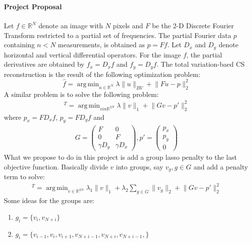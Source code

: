 \documentclass[12pt, leqno]{article}
\providecommand{\norm}[1]{\lVert#1\rVert} %
\DeclareMathOperator*{\argmin}{arg\,min}
\begin{document}
\pagestyle{fancy}

\begin{center}
{\large {\bf Project Proposal}} \\
\end{center}

\paragraph{} Let $f \in \mathbb{R}^N$ denote an image with $N$ pixels and $F$ be the 2-D Discrete Fourier Transform restricted to a partial set of frequencies. The partial Fourier data $p$ containing $n<N$ measurements, is obtained as $p = Ff$. Let $D_x$ and $D_y$ denote horizontal and vertical differential operators.  For the image $f$, the partial derivatives are obtained by $f_x =  D_x f$ and $f_y = D_y f$. The total variation-baed CS reconstruction is the result of the following optimization problem:
$$
\hat{f} = \argmin_{u \in \mathbb{R}^N} \lambda \norm{u}_{BV} + \norm{Fu-p}_2^2
$$
A similar problem is to solve the following problem:
\begin{align*}
[\hat{f}_x,\hat{f}_y]^T = \argmin_{v in \mathbb{R}^{2N}} \lambda \norm{v}_1 + \norm{Gv - p'}_2^2
\end{align*}
where $p_x = FD_xf$, $p_y = FD_yf$ and 
\begin{align*}
G = \begin{pmatrix} F & 0 \\
0& F\\
\gamma D_y & \gamma D_x
\end{pmatrix}, 
p' = \begin{pmatrix} p_x \\ p_y \\ 0 \end{pmatrix}
\end{align*}
What we propose to do in this project is add a group lasso penalty to the last objective function. Basically divide $v$ into groups, say $v_g, g \in G$ and add a penalty term to solve:
\begin{align*}
[\hat{f}_x,\hat{f}_y]^T = \argmin_{v \in \mathbb{R}^{2N}} \lambda_1 \norm{v}_1 + \lambda_2 \sum_{g \in G} \norm{v_g}_2 + \norm{Gv - p'}_2^2
\end{align*}
Some ideas for the groups are:
\begin{enumerate}
\item $g_i = \{v_i, v _{N+i}\}$
\item $g_i = \{v_{i-1},v_{i},v_{i+1},v_{N+i-1},v_{N+i},v_{N+i-1},\}$
\end{enumerate}
\end{document}

